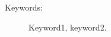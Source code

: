 \documentclass[10pt]{article}
\title{
\center{
	\textbf{Technical Report Name}
	}
\author{Author1 \\ \url{author1@csrg.inf.utfsm.cl} \\
	Author2 \\ \url{author2@csrg.inf.utfsm.cl} \\
	}
\date{Valparaíso, \today}
}
\newenvironment{keywords}{\begin{description}\item[Keywords:]}{\end{description}}
\begin{document}
\maketitle

\vspace{0.5cm}

\begin{center}
	\begin{abstract}
		
	\end{abstract}
\end{center}

\vspace{0.4cm}

\begin{center}
\begin{keywords}
Keyword1, keyword2.
\end{keywords}
\end{center}

\vspace{1cm}

\thispagestyle{empty}

\newpage
\tableofcontents

\newpage
%

\newpage
%

\newpage
%

\newpage
%

\newpage
%

\newpage
%

\newpage
\thispagestyle{empty}

%
%
\end{document}
